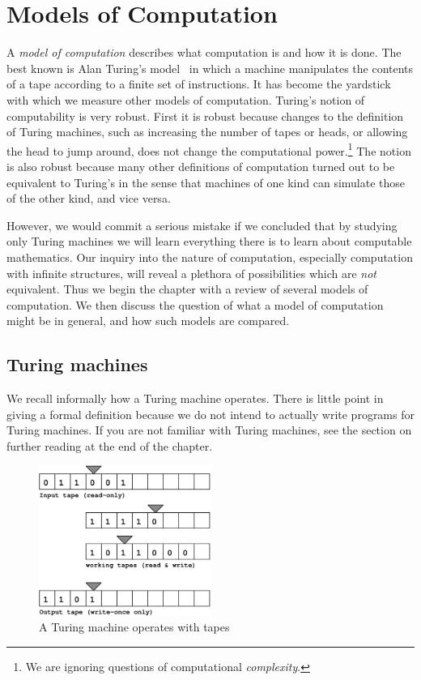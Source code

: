 \chapter{Models of Computation}
\label{cha:models}


A \emph{model of computation} describes what computation is and how it
is done. The best known is Alan Turing's model~\cite{Turing} in which
a machine manipulates the contents of a tape according to a finite set
of instructions. It has become the yardstick with which we measure
other models of computation. Turing's notion of computability is very
robust. First it is robust because changes to the definition of Turing
machines, such as increasing the number of tapes or heads, or allowing
the head to jump around, does not change the computational
power.\footnote{We are ignoring questions of computational
  \emph{complexity}.} The notion is also robust because many other
definitions of computation turned out to be equivalent to Turing's in
the sense that machines of one kind can simulate those of the other
kind, and vice versa.

However, we would commit a serious mistake if we concluded that by
studying only Turing machines we will learn everything there is to
learn about computable mathematics. Our inquiry into the nature of
computation, especially computation with infinite structures, will
reveal a plethora of possibilities which are \emph{not} equivalent.
Thus we begin the chapter with a review of several models of
computation. We then discuss the question of what a model of
computation might be in general, and how such models are compared.


\section{Turing machines}
\label{sec:turing-machines}

We recall informally how a Turing machine operates. There is little
point in giving a formal definition because we do not intend to
actually write programs for Turing machines. If you are not familiar
with Turing machines, see the section on further reading at the end of
the chapter.

\begin{figure}[htbp]
  \centering
  \includegraphics[width=0.5\textwidth]{turing_machine}
  \caption{A Turing machine operates with tapes}
  \label{fig:turing-machine}
\end{figure}

